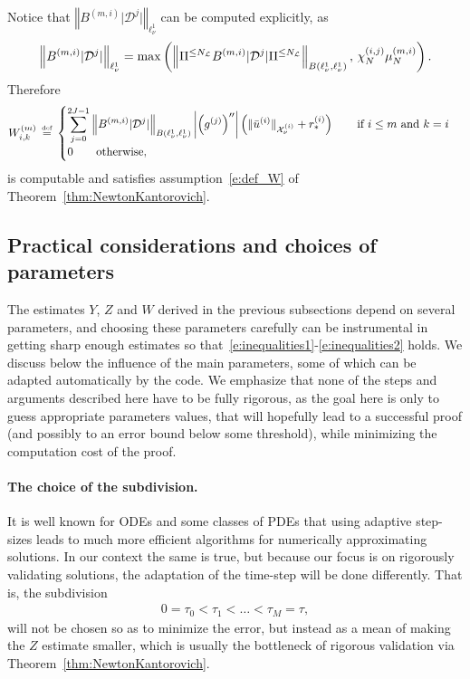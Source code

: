 \documentclass[10pt,a4paper]{article}
\theoremstyle{plain}
\renewcommand{\L}{\mathcal{L}}
\newcommand{\D}{\mathcal{D}}
\newcommand{\X}{\mathcal{X}}
\newcommand{\bu}{\bar{u}}
\newcommand{\1}{\mathbf{1}}
\newcommand{\rstar}{r_*}
\newcommand{\ds}{\displaystyle}
\newcommand{\bydef}{\,\stackrel{\mbox{\tiny\textnormal{\raisebox{0ex}[0ex][0ex]{def}}}}{=}\,}
\newcommand{\NL}{N_{\text{\tiny{$\L$}}}}
\begin{document}
Notice that $\left\Vert B^{(m,i)}\vert \D^j\vert\right\Vert_{\ell^1_\nu}$ can be computed explicitly, as 
\begin{align*}
\left\Vert B^{(m,i)}\vert \D^j\vert\right\Vert_{\ell^1_\nu} = \max\left(\left\Vert \Pi^{\leq \NL} B^{(m,i)}\vert \D^j\vert\Pi^{\leq \NL}\right\Vert_{B(\ell^1_\nu,\ell^1_\nu)} ,\, \chi^{(i,j)}_{N} \mu^{(m,i)}_{N}\right).
\end{align*}
Therefore
\begin{align*}
W^{(m)}_{i,k} \bydef 
\begin{cases}
\ds \sum_{j=0}^{2J-1} \left\Vert B^{(m,i)}\vert \D^j\vert\right\Vert_{B(\ell^1_\nu,\ell^1_\nu)}    \left \vert \left( g^{(j)} \right)'' \right \vert \left( \Vert \bu^{(i)} \Vert_{\X^{(i)}_\nu} + \rstar^{(i)} \right) \qquad \text{if }i\leq m \text{ and } k=i\\
0 \qquad \text{otherwise},
\end{cases}
\end{align*}
is computable and satisfies assumption~\eqref{e:def_W} of Theorem~\ref{thm:NewtonKantorovich}.


\subsection{Practical considerations and choices of parameters}
\label{sec:parameters}

The estimates $Y$, $Z$ and $W$ derived in the previous subsections depend on several parameters, and choosing these parameters carefully can be instrumental in getting sharp enough estimates so that~\eqref{e:inequalities1}-\eqref{e:inequalities2} holds. We discuss below the influence of the main parameters, some of which can be adapted automatically by the code. We emphasize that none of the steps and arguments described here have to be fully rigorous, as the goal here is only to guess appropriate parameters values, that will hopefully lead to a successful proof (and possibly to an error bound below some threshold), while minimizing the computation cost of the proof.

\paragraph{The choice of the subdivision.} It is well known for ODEs and some classes of PDEs that using adaptive step-sizes leads to much more efficient algorithms for numerically approximating solutions. In our context the same is true, but because our focus is on rigorously validating solutions, the adaptation of the time-step will be done differently. That is, the subdivision 
\begin{align*}
0 = \tau_0 < \tau_1 < \ldots < \tau_M = \tau,
\end{align*}
will not be chosen so as to minimize the error, but instead as a mean of making the $Z$ estimate smaller, which is usually the bottleneck of rigorous validation via Theorem~\ref{thm:NewtonKantorovich}.
\end{document}
